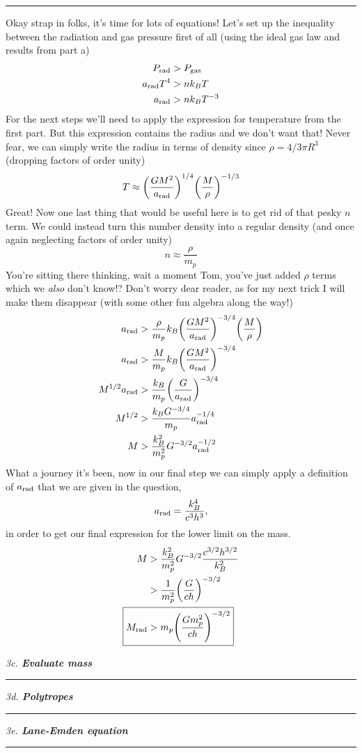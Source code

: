 \documentclass[12pt, letterpaper, twoside]{article}
\newcommand{\question}[1]{{\noindent \it #1}}
\newcommand{\answer}[1]{
    \par\noindent\rule{\textwidth}{0.4pt}#1\vspace{0.5cm}
}
\begin{document}
\answer{
    Okay strap in folks, it's time for lots of equations! Let's set up the inequality between the radiation and gas pressure first of all (using the ideal gas law and results from part a)
    \begin{align}
        P_{\rm rad} &> P_{\rm gas} \\
        a_{\rm rad} T^4 &> n k_B T \\
        a_{\rm rad} &> n k_B T^{-3}
    \end{align}
    For the next steps we'll need to apply the expression for temperature from the first part. But this expression contains the radius and we don't want that! Never fear, we can simply write the radius in terms of density since $\rho = 4/3 \pi R^3$ (dropping factors of order unity)
    \begin{equation}
        T \approx \qty(\frac{G M^2}{a_{\rm rad}})^{1/4} \qty(\frac{M}{\rho})^{-1/3}
    \end{equation}
    Great! Now one last thing that would be useful here is to get rid of that pesky $n$ term. We could instead turn this number density into a regular density (and once again neglecting factors of order unity)
    \begin{equation}
        n \approx \frac{\rho}{m_p}
    \end{equation}
    You're sitting there thinking, wait a moment Tom, you've just added $\rho$ terms which we \textit{also} don't know!? Don't worry dear reader, as for my next trick I will make them disappear (with some other fun algebra along the way!)
    \begin{align}
        a_{\rm rad} &> \frac{\rho}{m_p} k_B \qty(\frac{G M^2}{a_{\rm rad}})^{-3/4} \qty(\frac{M}{\rho}) \\
        a_{\rm rad} &> \frac{M}{m_p} k_B \qty(\frac{G M^2}{a_{\rm rad}})^{-3/4} \\
        M^{1/2} a_{\rm rad} &> \frac{k_B}{m_p} \qty(\frac{G}{a_{\rm rad}})^{-3/4} \\
        M^{1/2} &> \frac{k_B G^{-3/4}}{m_p} a_{\rm rad}^{-1/4} \\
        M &> \frac{k_B^2}{m_p^2} G^{-3/2} a_{\rm rad}^{-1/2}
    \end{align}
    What a journey it's been, now in our final step we can simply apply a definition of $a_{\rm rad}$ that we are given in the question,
    \begin{equation}
        a_{\rm rad} = \frac{k_B^4}{c^3 h^3},
    \end{equation}
    in order to get our final expression for the lower limit on the mass.
    \begin{align}
        M &> \frac{k_B^2}{m_p^2} G^{-3/2} \frac{c^{3/2} h^{3/2}}{k_B^2} \\
          &> \frac{1}{m_p^2} \qty(\frac{G}{c h})^{-3/2} \\
        \Aboxed{ M_{\rm rad} &> m_p \qty(\frac{G m_p^2}{c h})^{-3/2} }
    \end{align}
}

\question{3c. \textbf{Evaluate mass}}
\answer{

}

\question{3d. \textbf{Polytropes}}
\answer{

}

\question{3e. \textbf{Lane-Emden equation}}
\answer{

}
\end{document}
